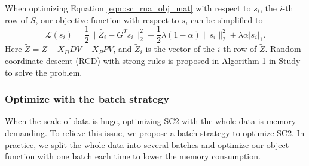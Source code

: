 \documentclass[12pt]{article}
\begin{document}
    When optimizing Equation \ref{eqn::sc_rna_obj_mat} with respect to $s_i$, the $i$-th row of $S$, our objective function with respect to $s_i$ can be simplified to 
    \begin{equation}
      \label{eqn::solve_coding}
      \mathcal{L} (s_i) = \frac{1}{2} \| \tilde{Z_i} - G^T s_i \|_2^2 + \frac{1}{2} \lambda (1 - \alpha)\|s_i\|_2^2 + \lambda \alpha |s_i|_1.
    \end{equation}
    Here $\tilde{Z} = Z - X_D D V - X_P P V$, and $\tilde{Z}_i$ is the vector of the $i$-th row of $\tilde{Z}$. Random coordinate descent (RCD) with strong rules is proposed in Algorithm 1 in Study \cite{kai2022insider} to solve the problem.
  
  \subsubsection*{Optimize with the batch strategy}
    When the scale of data is huge, optimizing SC2 with the whole data is memory demanding. To relieve this issue, we propose a batch strategy to optimize SC2. In practice, we split the whole data into several batches and optimize our object function with one batch each time to lower the memory consumption.
    
\end{document}
